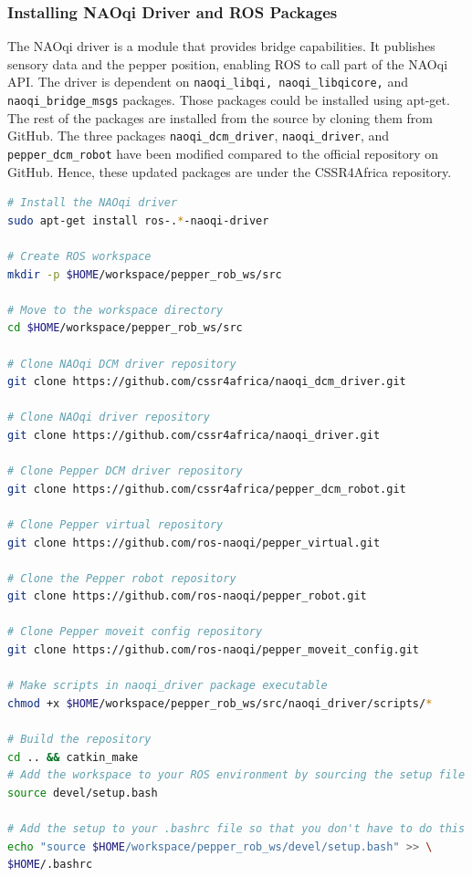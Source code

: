 \documentclass{CSSRforAfrica}
\begin{document}
{\subsubsection*{Installing NAOqi Driver and ROS Packages}

The NAOqi driver is a module that provides bridge capabilities. It publishes sensory data and the pepper position, enabling ROS to call part of the NAOqi API. The driver is dependent on \texttt{naoqi\_libqi, naoqi\_libqicore,} and \texttt{naoqi\_bridge\_msgs} packages. Those packages could be installed using apt-get. The rest of the packages are installed from the source by cloning them from GitHub. The three packages \texttt{naoqi\_dcm\_driver}, \texttt{naoqi\_driver}, and \texttt{pepper\_dcm\_robot} have been modified compared to the official repository on GitHub. Hence, these updated packages are under the CSSR4Africa repository.

\begin{lstlisting}[style=withoutNumbering, language=bash]
# Install the NAOqi driver
sudo apt-get install ros-.*-naoqi-driver

# Create ROS workspace
mkdir -p $HOME/workspace/pepper_rob_ws/src

# Move to the workspace directory
cd $HOME/workspace/pepper_rob_ws/src

# Clone NAOqi DCM driver repository
git clone https://github.com/cssr4africa/naoqi_dcm_driver.git

# Clone NAOqi driver repository
git clone https://github.com/cssr4africa/naoqi_driver.git

# Clone Pepper DCM driver repository
git clone https://github.com/cssr4africa/pepper_dcm_robot.git

# Clone Pepper virtual repository
git clone https://github.com/ros-naoqi/pepper_virtual.git

# Clone the Pepper robot repository
git clone https://github.com/ros-naoqi/pepper_robot.git

# Clone Pepper moveit config repository
git clone https://github.com/ros-naoqi/pepper_moveit_config.git

# Make scripts in naoqi_driver package executable
chmod +x $HOME/workspace/pepper_rob_ws/src/naoqi_driver/scripts/*

# Build the repository
cd .. && catkin_make
# Add the workspace to your ROS environment by sourcing the setup file in the devel folder
source devel/setup.bash

# Add the setup to your .bashrc file so that you don't have to do this every time you open a new terminal
echo "source $HOME/workspace/pepper_rob_ws/devel/setup.bash" >> \
$HOME/.bashrc


\end{lstlisting}}
\end{document}
